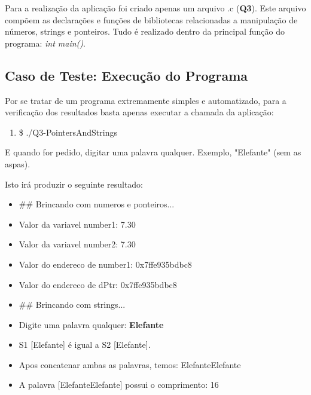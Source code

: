   Para a realização da aplicação foi criado apenas um arquivo .c (\textbf{Q3}). Este arquivo compõem as declarações e
  funções de bibliotecas relacionadas a manipulação de números, strings e ponteiros. Tudo é realizado dentro da
  principal função do programa: \textit{int main()}.

  \subsection{Caso de Teste: Execução do Programa}

	  Por se tratar de um programa extremamente simples e automatizado, para a verificação dos resultados basta apenas
	  executar a chamada da aplicação:

	  \begin{enumerate}
	    \item \$ ./Q3-PointersAndStrings
	  \end{enumerate}

	  E quando for pedido, digitar uma palavra qualquer. Exemplo, "Elefante" (sem as aspas).

	  Isto irá produzir o seguinte resultado:

	  \begin{itemize}
	    \item \#\# Brincando com numeros e ponteiros...
	    \item Valor da variavel number1: 7.30
	    \item Valor da variavel number2: 7.30

	    \item Valor do endereco de number1: 0x7ffe935bdbc8
	    \item Valor do endereco de dPtr: 0x7ffe935bdbc8

	    \item \#\# Brincando com strings...
	    \item Digite uma palavra qualquer: \textbf{Elefante}

	    \item S1 [Elefante] é igual a S2 [Elefante].
	    \item Apos concatenar ambas as palavras, temos: ElefanteElefante
	    \item A palavra [ElefanteElefante] possui o comprimento: 16
	  \end{itemize}
